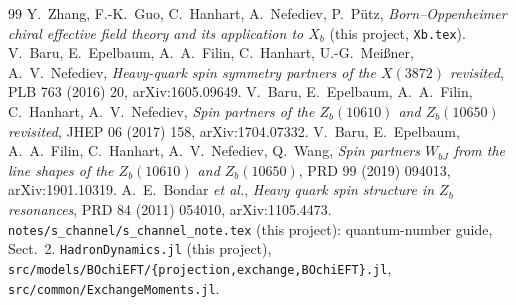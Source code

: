 \documentclass[11pt,a4paper]{article}
\begin{document}
\begin{thebibliography}{99}
\small
{} Y.~Zhang, F.-K.~Guo, C.~Hanhart, A.~Nefediev, P.~P\"utz, \emph{Born--Oppenheimer chiral effective field theory and its application to $X_b$} (this project, \texttt{Xb.tex}).
 V.~Baru, E.~Epelbaum, A.~A.~Filin, C.~Hanhart, U.-G.~Mei\ss ner, A.~V.~Nefediev, \emph{Heavy-quark spin symmetry partners of the $X(3872)$ revisited}, PLB 763 (2016) 20, arXiv:1605.09649.
 V.~Baru, E.~Epelbaum, A.~A.~Filin, C.~Hanhart, A.~V.~Nefediev, \emph{Spin partners of the $Z_b(10610)$ and $Z_b(10650)$ revisited}, JHEP 06 (2017) 158, arXiv:1704.07332.
 V.~Baru, E.~Epelbaum, A.~A.~Filin, C.~Hanhart, A.~V.~Nefediev, Q.~Wang, \emph{Spin partners $W_{bJ}$ from the line shapes of the $Z_b(10610)$ and $Z_b(10650)$}, PRD 99 (2019) 094013, arXiv:1901.10319.
 A.~E.~Bondar \emph{et al.}, \emph{Heavy quark spin structure in $Z_b$ resonances}, PRD 84 (2011) 054010, arXiv:1105.4473.
 \texttt{notes/s\_channel/s\_channel\_note.tex} (this project): quantum-number guide, Sect.~2.
 \texttt{HadronDynamics.jl} (this project), \texttt{src/models/BOchiEFT/\{projection,exchange,BOchiEFT\}.jl}, \texttt{src/common/ExchangeMoments.jl}.
\end{thebibliography}
\end{document}
